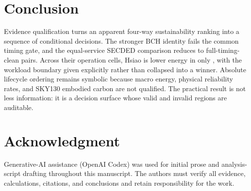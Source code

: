 \documentclass[conference]{IEEEtran}
\begin{document}
\section{Conclusion}
Evidence qualification turns an apparent four-way sustainability ranking into
a sequence of conditional decisions. The stronger BCH identity fails the common
timing gate, and the equal-service SECDED comparison reduces to
\PrimarySeedCount{} full-timing-clean pairs. Across their
\PrimaryComparisonCount{} operation cells, Hsiao is lower energy in only
\HsiaoLowerCount{}, with the workload boundary given explicitly rather than
collapsed into a winner. Absolute lifecycle ordering remains symbolic because
macro energy, physical reliability rates, and SKY130 embodied carbon are not
qualified. The practical result is not less information: it is a decision
surface whose valid and invalid regions are auditable.

\section*{Acknowledgment}
Generative-AI assistance (OpenAI Codex) was used for initial prose and analysis-
script drafting throughout this manuscript. The authors must verify all evidence,
calculations, citations, and conclusions and retain responsibility for the work.

\clearpage


\end{document}
